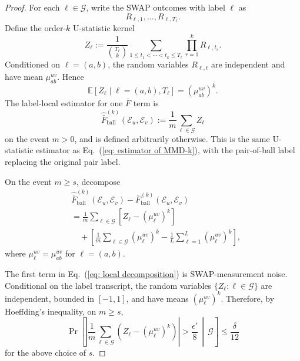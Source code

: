 \documentclass[aps,prx,reprint,superscriptaddress,amsmath,amssymb,longbibliography,floatfix]{revtex4-2}
\newcommand{\Abs}[1]{\left\lvert #1\right\rvert}
\newcommand{\dsE}{\mathbb{E}}
\newcommand{\scE}{\mathcal{E}}
\theoremstyle{plain}
\theoremstyle{definition}
\theoremstyle{remark}
\begin{document}
\begin{proof}
    For each $\ell\in\mathcal G$, write the SWAP outcomes with label $\ell$ as
    \[
        R_{\ell,1},\ldots,R_{\ell,T_\ell}.
    \]
    Define the order-$k$ U-statistic kernel
    \begin{equation}
        Z_\ell
        :=
        \frac{1}{\binom{T_\ell}{k}}
        \sum_{1\le t_1<\cdots<t_k\le T_\ell}
        \prod_{r=1}^k R_{\ell,t_r}.
        \label{eq: local epsilon ball U statistic}
    \end{equation}
    Conditioned on $\ell=(a,b)$, the random variables $R_{\ell,t}$ are independent and have mean $\mu_{ab}^{uv}$. Hence
    \begin{equation}
        \dsE[Z_\ell\mid \ell=(a,b),T_\ell]
        =
        \left(\mu_{ab}^{uv}\right)^k.
        \label{eq: local Z ell mean}
    \end{equation}
    The label-local estimator for one $\bar F$ term is
    \begin{equation}
        \widehat{\bar F}^{(k)}_{\mathrm{ball}}(\scE_u,\scE_v)
        :=
        \frac1m\sum_{\ell\in\mathcal G} Z_\ell
    \end{equation}
    on the event $m>0$, and is defined arbitrarily otherwise. This is the same U-statistic estimator as Eq.~(\ref{eq: estimator of MMD-k}), with the pair-of-ball label replacing the original pair label.

    On the event $m\ge s$, decompose
    \begin{align}
&\widehat{\bar F}^{(k)}_{\mathrm{ball}}(\scE_u,\scE_v)
        -
        \bar F^{(k)}_{\mathrm{ball}}(\scE_u,\scE_v)
        \nonumber\\
    &=
        \frac1m\sum_{\ell\in\mathcal G}
        \left[
            Z_\ell
            -
            (\mu_\ell^{uv})^k
        \right] \nonumber\\
        &\quad+
        \left[
            \frac1m\sum_{\ell\in\mathcal G}
            (\mu_\ell^{uv})^k
            -
            \frac1L\sum_{\ell=1}^L
            (\mu_\ell^{uv})^k
        \right],
        \label{eq: local decomposition}
\end{align}
    where $\mu_\ell^{uv}=\mu_{ab}^{uv}$ for $\ell=(a,b)$.

    The first term in Eq.~(\ref{eq: local decomposition}) is SWAP-measurement noise. Conditional on the label transcript, the random variables $\{Z_\ell:\ell\in\mathcal G\}$ are independent, bounded in $[-1,1]$, and have means $(\mu_\ell^{uv})^k$. Therefore, by Hoeffding's inequality, on $m\ge s$,
    \begin{equation}
        \Pr\!\left[
            \Abs{
                \frac1m\sum_{\ell\in\mathcal G}
                \left(
                    Z_\ell
                    -
                    (\mu_\ell^{uv})^k
                \right)
            }
            >
            \frac{\epsilon'}8
            \,\middle|\,
            \mathcal G
        \right]
        \le
        \frac{\delta}{12}
    \end{equation}
    for the above choice of $s$.


\end{proof}
\end{document}
